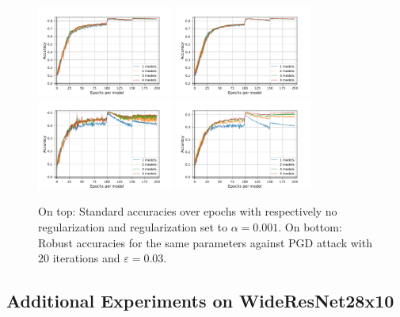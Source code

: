 \begin{figure}[ht]
    \centering
    \includegraphics[width=0.40\textwidth]{Images/standard_acc_finalrun_ResNet18_1024_200_-1_bis.pdf}    \includegraphics[width=0.40\textwidth]{Images/standard_acc_finalrun_ResNet18_1024_200_0.001_bis.pdf}\\

    \includegraphics[width=0.40\textwidth]{Images/robust_acc_finalrun_ResNet18_1024_200_-1_bis.pdf}    \includegraphics[width=0.40\textwidth]{Images/robust_acc_finalrun_ResNet18_1024_200_0.001_bis.pdf}
    \caption{On top: Standard accuracies over epochs with respectively no regularization and regularization set to $\alpha=0.001$. On bottom: Robust accuracies for the same parameters against PGD attack with $20$ iterations and $\varepsilon=0.03$.}
    \label{fig:xp-regularization}
\end{figure}

\subsection{Additional Experiments on WideResNet28x10}

